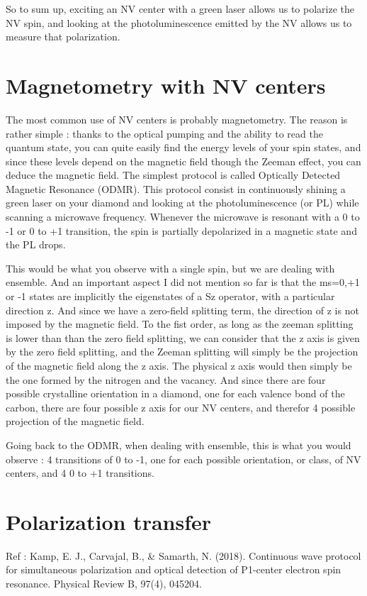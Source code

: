 \documentclass[a4paper]{article}
\begin{document}
So to sum up, exciting an NV center with a green laser allows us to polarize the NV spin, and looking at the photoluminescence emitted by the NV allows us to measure that polarization.

\section{Magnetometry with NV centers}
The most common use of NV centers is probably magnetometry. The reason is rather simple : thanks to the optical pumping and the ability to read the quantum state, you can quite easily find the energy levels of your spin states, and since these levels depend on the magnetic field though the Zeeman effect, you can deduce the magnetic field. 
The simplest protocol is called Optically Detected Magnetic Resonance (ODMR). This protocol consist in continuously shining a green laser on your diamond and looking at the photoluminescence (or PL) while scanning a microwave frequency. Whenever the microwave is resonant with a 0 to -1 or 0 to +1 transition, the spin is partially depolarized in a magnetic state and the PL drops.%

This would be what you observe with a single spin, but we are dealing with ensemble. And an important aspect I did not mention so far is that the ms=0,+1 or -1 states are implicitly the eigenstates of a Sz operator, with a particular direction z. And since we have a zero-field splitting term, the direction of z is not imposed by the magnetic field. To the fist order, as long as the zeeman splitting is lower than than the zero field splitting, we can consider that the z axis is given by the zero field splitting, and the Zeeman splitting will simply be the projection of the magnetic field along the z axis. 
The physical z axis would then simply be the one formed by the nitrogen and the vacancy. And since there are four possible crystalline orientation in a diamond, one for each valence bond of the carbon, there are four possible z axis for our NV centers, and therefor 4 possible projection of the magnetic field. %

Going back to the ODMR, when dealing with ensemble, this is what you would observe : 4 transitions of 0 to -1, one for each possible orientation, or class, of NV centers, and 4 0 to +1 transitions.

\section{Polarization transfer}
Ref : Kamp, E. J., Carvajal, B., \& Samarth, N. (2018). Continuous wave protocol for simultaneous polarization and optical detection of P1-center electron spin resonance. Physical Review B, 97(4), 045204.
\end{document}
